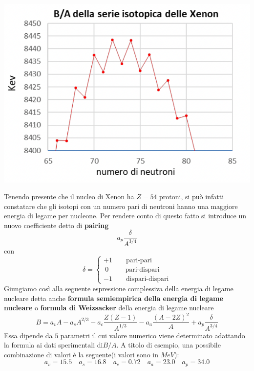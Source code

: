 \begin{marginfigure}
	\includegraphics[scale = 1.5]{figs/goccia5}
	\label{fig:goccia5}
\end{marginfigure}
Tenendo presente che il nucleo di Xenon ha \(Z=54\) protoni, si può
infatti constatare che gli isotopi con un numero pari di neutroni hanno
una maggiore energia di legame per nucleone.
Per rendere conto di questo
fatto si introduce un nuovo coefficiente detto di \textbf{pairing} \[
	a_{p} \frac{\delta}{A^{3/4}}
\] con \[
	\delta =
	\begin{cases}
		+1    \qquad  \text{pari-pari}       \\
		\ 0  \qquad  \ \ \text{pari-dispari} \\
		-1  \qquad  \text{dispari-dispari}
	\end{cases}
\] Giungiamo così alla seguente espressione complessiva della energia di
legame nucleare detta anche \textbf{formula semiempirica della energia
	di legame nucleare} o \textbf{formula di Weizsacker} della energia di
legame nucleare \begin{equation}
	\boxed{    B = a_{v}A - a_{s}A^{2/3} - a_{c} \frac{Z(Z-1)}{A^{1/3}} - a_{a}\frac{(A-2Z)^{2}}{A} +     a_{p} \frac{\delta}{A^{3/4}}}
\end{equation} Essa dipende da \(5\) parametri il cui valore numerico
viene determinato adattando la formula ai dati sperimentali di\(B/A\).
A
titolo di esempio, una possibile combinazione di valori è la seguente(i
valori sono in \(MeV\)): \[
	a_{v} = 15.5 \quad a_{s} = 16.8 \quad a_{c} = 0.72 \quad a_{a} = 23.0 \quad a_{p} = 34.0
\]

